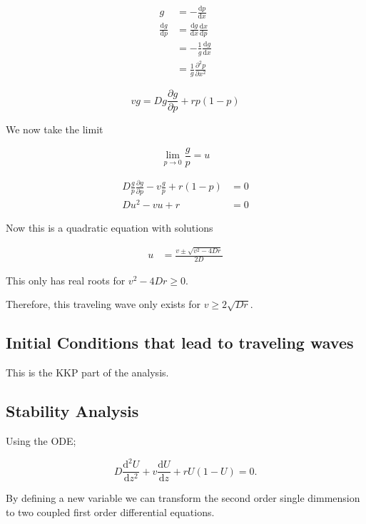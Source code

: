 \documentclass{standalone}
\begin{document}
\begin{align*}
g & = - \frac{\mathrm{d} p}{\mathrm{d} x} \\
\frac{\mathrm{d} g}{\mathrm{d} p} & = \frac{\mathrm{d} g}{\mathrm{d} x} \frac{\mathrm{d} x}{\mathrm{d} p} \\
& = - \frac{1}{g} \frac{\mathrm{d} g}{\mathrm{d} x} \\
& = \frac{1}{g} \frac{\partial^2 p}{\partial x^2}
\end{align*}

\begin{equation}
vg =  D g \frac{\partial g}{\partial p} + rp(1-p)
\end{equation}

We now take the limit 

$$\lim _{p \rightarrow 0} \frac{g}{p} = u$$

\begin{align*}
D \frac{g}{p} \frac{\partial g}{\partial p} - v \frac{g}{p} + r(1-p) & = 0 \\
D u ^2 - vu + r & = 0 
\end{align*}

Now this is a quadratic equation with solutions 

\begin{align*}
u & = \frac{v \pm \sqrt{v^2 - 4Dr}}{2D}
\end{align*}

This only has real roots for $v^2 - 4Dr \geq 0 $. 

Therefore, this traveling wave only exists for $v \geq 2 \sqrt{Dr}$.

\subsection{Initial Conditions that lead to traveling waves}

This is the KKP part of the analysis. 

\subsection{Stability Analysis}

Using the ODE; 

\begin{equation}
D \frac{\mathrm{d} ^2 U}{\mathrm{d} z^2} + v \frac{\mathrm{d} U}{\mathrm{d} z}  + rU(1-U) =0.
\end{equation}

By defining a new variable we can transform the second order single dimmension to two coupled first order differential equations. 
\end{document}
